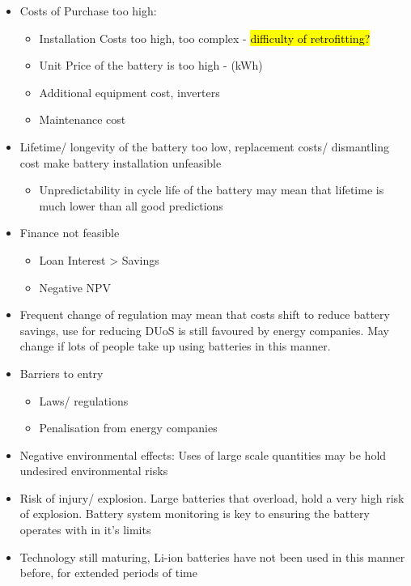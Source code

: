 \begin{itemize}
\tightlist
\item
  Costs of Purchase too high:

  \begin{itemize}
  \tightlist
  \item
    Installation Costs too high, too complex -
    \hl{difficulty of retrofitting?}
  \item
    Unit Price of the battery is too high - (kWh)
  \item
    Additional equipment cost, inverters
  \item
    Maintenance cost
  \end{itemize}
\item
  Lifetime/ longevity of the battery too low, replacement costs/
  dismantling cost make battery installation unfeasible

  \begin{itemize}
  \tightlist
  \item
    Unpredictability in cycle life of the battery may mean that lifetime
    is much lower than all good predictions
  \end{itemize}
\item
  Finance not feasible

  \begin{itemize}
  \tightlist
  \item
    Loan Interest \textgreater{} Savings
  \item
    Negative NPV
  \end{itemize}
\item
  Frequent change of regulation may mean that costs shift to reduce
  battery savings, use for reducing DUoS is still favoured by energy
  companies. May change if lots of people take up using batteries in
  this manner.
\item
  Barriers to entry

  \begin{itemize}
  \tightlist
  \item
    Laws/ regulations
  \item
    Penalisation from energy companies
  \end{itemize}
\item
  Negative environmental effects: Uses of large scale quantities may be
  hold undesired environmental risks
\item
  Risk of injury/ explosion. Large batteries that overload, hold a very
  high risk of explosion. Battery system monitoring is key to ensuring
  the battery operates with in it's limits
\item
  Technology still maturing, Li-ion batteries have not been used in this
  manner before, for extended periods of time
\end{itemize}

